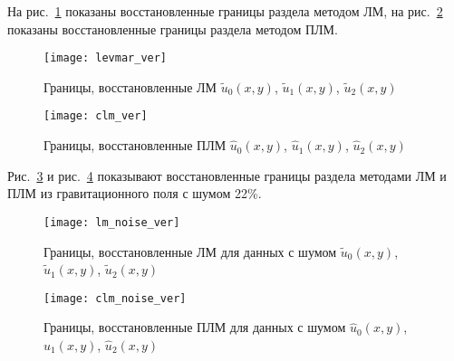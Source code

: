 На рис.~\ref{fig:levmar} показаны восстановленные границы раздела методом ЛМ, на рис.~\ref{fig:clm} показаны восстановленные границы раздела методом ПЛМ.
\begin{figure}[H]
	\centering
	\texttt{[image: levmar\_ver]}
	\caption{Границы, восстановленные ЛМ $\tilde{u}_0(x,y)$, $\tilde{u}_1(x,y)$, $\tilde{u}_2(x,y)$}
	\label{fig:levmar}
\end{figure}
\begin{figure}[H]
	\centering
	\texttt{[image: clm\_ver]}
	\caption{Границы, восстановленные ПЛМ $\hat{u}_0(x,y)$, $\hat{u}_1(x,y)$, $\hat{u}_2(x,y)$}
	\label{fig:clm}
\end{figure}

Рис.~\ref{fig:noise_lm} и рис.~\ref{fig:noise_clm} показывают восстановленные границы раздела методами ЛМ и ПЛМ из гравитационного поля с шумом 22\%.
\begin{figure}[H]
	\centering
	\texttt{[image: lm\_noise\_ver]}
	\caption{Границы, восстановленные ЛМ для данных с шумом $\tilde{u}_0(x,y)$, $\tilde{u}_1(x,y)$, $\tilde{u}_2(x,y)$}
	\label{fig:noise_lm}
\end{figure}
\begin{figure}[H]
	\centering
	\texttt{[image: clm\_noise\_ver]}
	\caption{Границы, восстановленные ПЛМ для данных с шумом $\hat{u}_0(x,y)$, $\hat{u}_1(x,y)$, $\hat{u}_2(x,y)$}
	\label{fig:noise_clm}
\end{figure}
